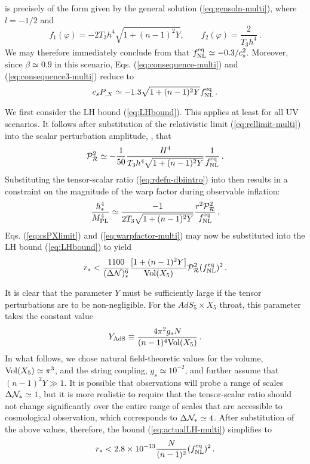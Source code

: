  is precisely of the form given by the 
general solution (\ref{eq:gensoln-multi}), where $l=-1/2$ and 
% 
\begin{equation}
\label{eq:fdefns-multi}
f_1 (\varphi) = -2T_3 h^4 \sqrt{1+(n-1)^2Y} , \qquad 
f_2 (\varphi) = \frac{2}{T_3 h^4} \,.
\end{equation}
% 
We may therefore immediately conclude from  that
$f_{\mathrm{NL}}^{\mathrm{eq}}
\simeq -0.3/c_s^2$. Moreover, since $\beta \simeq 0.9$ in this scenario, 
Eqs. (\ref{eq:consequence-multi}) and (\ref{eq:consequence3-multi}) reduce to  
% 
\begin{equation}
\label{eq:csPXlimit}
c_sP_{,X} \simeq -1.3 \sqrt{1+(n-1)^2Y} f_{\mathrm{NL}}^{\mathrm{eq}} \,.
\end{equation}
% 


We first consider the LH bound (\ref{eq:LHbound}). This applies at least for all
UV scenarios. It follows after substitution of the relativistic limit
(\ref{eq:rellimit-multi}) into the scalar perturbation amplitude,
,
that 
% 
\begin{equation}
\label{eq:usefulPs-multi}
\mathcal{P}_{\mathcal{R}}^2  \simeq -\frac{1}{50} \frac{H^4}{T_3 h^4\sqrt{1+(n-1)^2Y}}
\frac{1}{f_{\mathrm{NL}}^{\mathrm{eq}}}\,.
\end{equation}
% 
Substituting the tensor-scalar ratio (\ref{eq:rdefn-dbiintro}) into  
 then results in a constraint on the magnitude of 
the warp factor during observable inflation:
%  
\begin{equation}
\label{eq:warpfactor-multi}
\frac{h^4_*}{M_{\mathrm{PL}}^4} \simeq \frac{-1}{2 T_3 \sqrt{1+(n-1)^2Y}} 
\frac{r^2 \mathcal{P}_{\mathcal{R}}^2 }{f_{\mathrm{NL}}^{\mathrm{eq}}} \,.
\end{equation}
% 
Eqs. (\ref{eq:csPXlimit}) and (\ref{eq:warpfactor-multi}) may now be substituted into 
the LH bound (\ref{eq:LHbound}) to yield
%  
\begin{equation}
\label{eq:actualLH-multi}
r_* < \frac{1100}{(\Delta \mathcal{N} )_*^6} 
\frac{[1+(n-1)^2Y]}{\mathrm{Vol} (X_5)} \mathcal{P}_{\mathcal{R}}^2  (f_{\mathrm{NL}}^{\mathrm{eq}})^2 \,.
\end{equation}
% 


It is clear that the parameter $Y$ 
must be sufficiently large if the tensor perturbations 
are to be non-negligible. For the $AdS_5 \times X_5$ throat, this parameter  
takes the constant value    
% 
\begin{equation}
\label{eq:YAds-multi}
Y_{\mathrm{AdS}} \equiv \frac{4\pi^2 g_s N}{(n-1)^4 \mathrm{Vol} (X_5)} \,.
\end{equation}
% 
In what follows, we chose natural field-theoretic values for the volume, 
$\mathrm{Vol} (X_5) \simeq \pi^3$, and the string coupling, 
$g_s \simeq 10^{-2}$, and further assume that 
$(n-1)^2 Y \gg 1$. It is possible that observations will probe a 
range of scales $\Delta \mathcal{N}_* \simeq 1$, 
but it is more realistic to require that 
the tensor-scalar ratio should not change significantly over the 
entire range of scales that are accessible to cosmological observation,  
which corresponds to $\Delta \mathcal{N}_* \simeq 4$.
After substitution of the above values, therefore, 
the bound (\ref{eq:actualLH-multi}) simplifies to
%  
\begin{equation}
\label{eq:AdSupper-multi}
r_* < 2.8 \times 10^{-13} \frac{N}{(n-1)^2} (f_{\mathrm{NL}}^{\mathrm{eq}})^2 \,.
\end{equation}
% 


